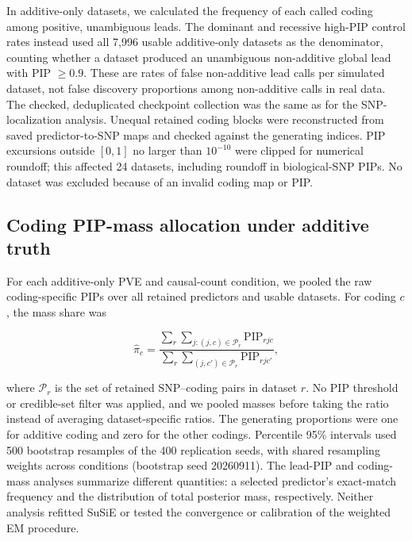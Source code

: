 \documentclass[12pt]{article}
\begin{document}
In additive-only datasets, we calculated the frequency of
each called coding among positive, unambiguous leads. The dominant
and recessive high-PIP control rates instead used all 7,996 usable
additive-only datasets as the denominator, counting whether a dataset
produced an unambiguous non-additive global lead with PIP $\geq 0.9$.
These are rates of false non-additive lead calls per simulated dataset,
not false discovery proportions among non-additive calls in real data.
The checked, deduplicated checkpoint collection was the same as for
the SNP-localization analysis. Unequal retained coding blocks were
reconstructed from saved predictor-to-SNP maps and checked against
the generating indices. PIP excursions outside $[0,1]$ no larger than
$10^{-10}$ were clipped for numerical roundoff; this affected 24
datasets, including roundoff in biological-SNP PIPs. No dataset was
excluded because of an invalid coding map or PIP.

\subsection{Coding PIP-mass allocation under additive truth}

For each additive-only PVE and causal-count condition, we
pooled the raw coding-specific PIPs over all retained predictors and
usable datasets. For coding $c$, the mass share was

\begin{equation}
\widehat{\pi}_c =
\frac{\sum_{r}\sum_{j:(j,c)\in\mathcal{P}_r}\mathrm{PIP}_{rjc}}
     {\sum_{r}\sum_{(j,c')\in\mathcal{P}_r}\mathrm{PIP}_{rjc'}},
\end{equation}

where $\mathcal{P}_r$ is the set of retained SNP--coding
pairs in dataset $r$. No PIP threshold or credible-set filter was
applied, and we pooled masses before taking the ratio instead of
averaging dataset-specific ratios. The generating proportions were
one for additive coding and zero for the other codings. Percentile
95\% intervals used 500 bootstrap resamples of the 400 replication
seeds, with shared resampling weights across conditions (bootstrap
seed 20260911). The lead-PIP and coding-mass analyses summarize
different quantities: a selected predictor's exact-match frequency
and the distribution of total posterior mass, respectively. Neither
analysis refitted SuSiE or tested the convergence or calibration of
the weighted EM procedure.
\end{document}
